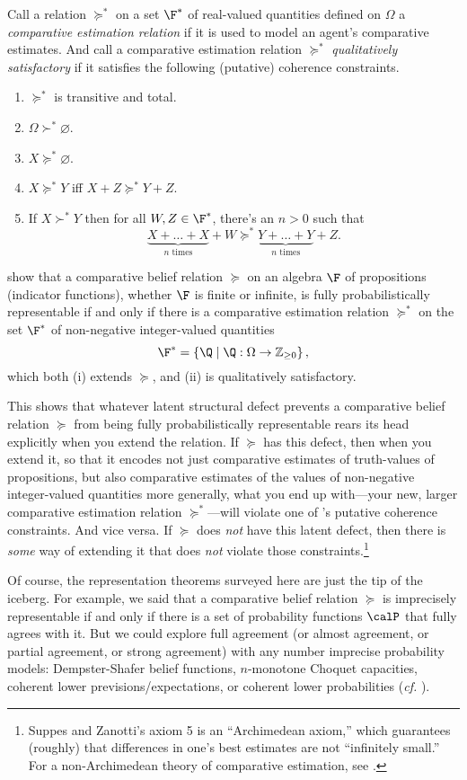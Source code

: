 Call a relation $\succeq^*$ on a set $\F^*$ of real-valued quantities defined on $\Omega$ a \textit{comparative estimation relation} if it is used to model an agent's comparative estimates. And call a comparative estimation relation $\succeq^*$ \textit{qualitatively satisfactory} if it satisfies the following (putative) coherence constraints.
\begin{enumerate}
\item $\succeq^*$ is transitive and total.
\item $\Omega\succ^*\varnothing$.
\item $X\succeq^*\varnothing$.
\item $X\succeq^* Y$ iff $X+Z\succeq^* Y+Z$.
\item If $X\succ^* Y$ then for all $W,Z\in\F^*$, there's an $n>0$ such that 
$$ \underbrace{X+\hdots+X}_{\text{$n$ times}}+W\succeq^* \underbrace{Y+\hdots+Y}_{\text{$n$ times}}+Z. $$
\end{enumerate}
\citet{Suppes1976} show that a comparative belief relation $\succeq$ on an algebra $\F$ of propositions (indicator functions), whether $\F$ is finite or infinite, is fully probabilistically representable if and only if there is a comparative estimation relation $\succeq^*$ on the set $\F^*$ of non-negative integer-valued quantities
$$ \F^*=\left\{\Q \mathrel{|} \Q:\Omega\rightarrow\mathbb{Z}_{\geq0}\right\}, $$
which both (i) extends $\succeq$, and (ii) is qualitatively satisfactory.

This shows that whatever latent structural defect prevents a comparative belief relation $\succeq$ from being fully probabilistically representable rears its head explicitly when you extend the relation. If $\succeq$ has this defect, then when you extend it, so that it encodes not just comparative estimates of truth-values of propositions, but also comparative estimates of the values of non-negative integer-valued quantities more generally, what you end up with---your new, larger comparative estimation relation $\succeq^*$---will violate one of \citeauthor{Suppes1976}'s putative coherence constraints. And vice versa. If $\succeq$ does \textit{not} have this latent defect, then there is \textit{some} way of extending it that does \textit{not} violate those constraints.\footnote{Suppes and Zanotti's axiom 5 is an ``Archimedean axiom,'' which guarantees (roughly) that differences in one's best estimates are not ``infinitely small.'' For a non-Archimedean theory of comparative estimation, see \citet{Pederson2014}.}

Of course, the representation theorems surveyed here are just the tip of the iceberg. For example, we said that a comparative belief relation $\succeq$ is imprecisely representable if and only if there is a set of probability functions $\calP$ that fully agrees with it. But we could explore full agreement (or almost agreement, or partial agreement, or strong agreement) with any number imprecise probability models: Dempster-Shafer belief functions, $n$-monotone Choquet capacities, coherent lower previsions/expectations, or coherent lower probabilities (\textit{cf.} \citealp{Walley1991, Walley2000, Augustin2014, Troffaes2014}).

